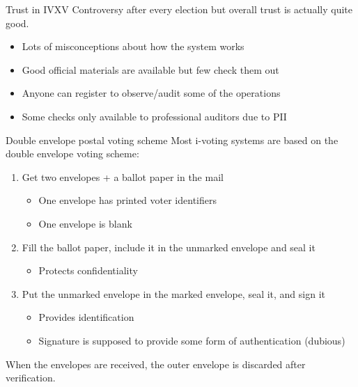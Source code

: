 \begin{frame}{Trust in IVXV}
  Controversy after every election but overall trust is actually quite good.
  \begin{itemize}[<+(1)->]
    \item Lots of misconceptions about how the system works
    \item Good official materials are available but few check them out
    \item Anyone can register to observe/audit some of the operations
    \item Some checks only available to professional auditors due to PII
  \end{itemize}
\end{frame}

\begin{frame}{Double envelope postal voting scheme}
  Most i-voting systems are based on the double envelope voting scheme:
  \begin{enumerate}[<+(1)->]
    \item Get two envelopes + a ballot paper in the mail
    \begin{itemize}
      \item One envelope has printed voter identifiers
      \item One envelope is blank
    \end{itemize}
    \item Fill the ballot paper, include it in the unmarked envelope and seal it
    \begin{itemize}
      \item Protects confidentiality
    \end{itemize}
    \item Put the unmarked envelope in the marked envelope, seal it, and sign it
    \begin{itemize}
      \item Provides identification
      \item Signature is supposed to provide some form of authentication (dubious)
    \end{itemize}
  \end{enumerate}

  \pause
  When the envelopes are received, the outer envelope is discarded after verification.
\end{frame}

